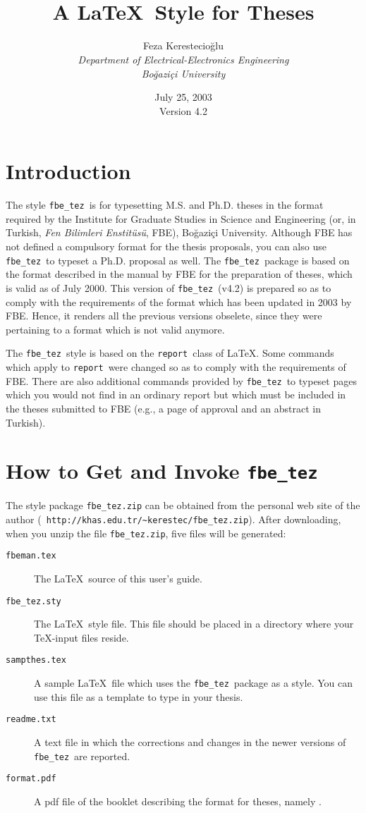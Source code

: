 \documentclass[12pt]{article}
\title{{\Huge \fbe{\tt.sty}} \\ A \LaTeX\ Style for Theses}
\author{Feza Kerestecio\u glu \\{\em Department of
Electrical-Electronics Engineering}\\{\em Bo\u gazi\c ci University}}
\date{July 25, 2003 \\ Version 4.2}
\newcommand\fbe{{\tt fbe\_tez}}
\newcommand\report{{\tt report}}
\begin{document}
\maketitle
\tableofcontents
\section{Introduction}
The style \fbe\ is for typesetting M.S. and Ph.D. theses in the
format required by the Institute for Graduate Studies in Science
and Engineering (or, in Turkish, {\em Fen Bilimleri
Enstit\"us\"u}, FBE), Bo\u gazi\c ci University. Although FBE has
not defined a compulsory format for the thesis proposals, you can
also use \fbe\ to typeset a Ph.D. proposal as well. The \fbe\
package is based on the format described in the manual
\cite{fbeman} by FBE for the preparation of theses, which is
valid as of July 2000. This version of \fbe\ (v4.2) is prepared so
as to comply with the requirements of the format which has been
updated in 2003 by FBE. Hence, it renders all the previous
versions obselete, since they were pertaining to a format which
is not valid anymore.

The \fbe\ style is based on the \report\ class of \LaTeX. Some
commands which apply to \report\ were changed so as to comply with
the requirements of FBE. There are also additional commands provided
by \fbe\ to typeset pages which you would not find in an ordinary
report but which must be included in the theses submitted to FBE
(e.g., a page of approval and an abstract in Turkish).

\section{How to Get and Invoke \fbe}
The style package \fbe{\tt .zip} can be obtained from the
personal web site of the author ({\tt
http://khas.edu.tr/\verb+~+kerestec/\fbe.zip}). After downloading,
when you unzip the file \fbe{\tt.zip}, five files will be
generated:
\begin{description}
\item[{\tt fbeman.tex}] The \LaTeX\ source of this user's guide.
\item[{\tt \fbe.sty}] The \LaTeX\ style file. This file should be
   placed in a directory where your \TeX-input files reside.
\item[{\tt sampthes.tex}] A sample \LaTeX\ file which uses the \fbe\
   package as a style. You can use this file as a template to type
   in your thesis.
\item[{\tt readme.txt}] A text file in which the corrections and
   changes in the newer versions of \fbe\ are reported.
\item[{\tt format.pdf}] A pdf file of the booklet describing the format
   for theses, namely \cite{fbeman}.
\end{description}
\end{document}
